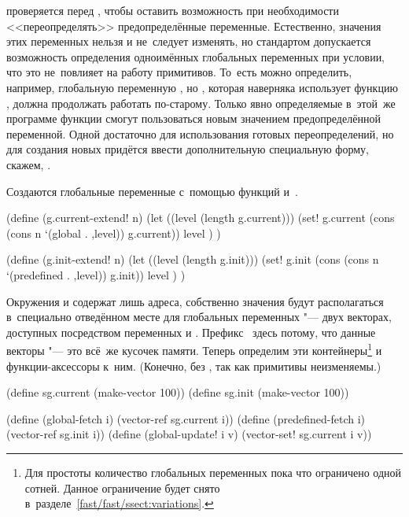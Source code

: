  проверяется перед , чтобы оставить возможность при
необходимости <<переопределять>> предопределённые переменные. Естественно,
значения этих переменных нельзя и не~следует изменять, но стандартом допускается
возможность определения одноимённых глобальных переменных при условии, что это
не~повлияет на работу примитивов. То~есть можно определить, например, глобальную
переменную , но , которая наверняка использует функцию ,
должна продолжать работать по-старому. Только явно определяемые в~этой~же
программе функции смогут пользоваться новым значением предопределённой
переменной. Одной  достаточно для использования готовых
переопределений, но для создания новых придётся ввести дополнительную
специальную форму, скажем, . 

Создаются глобальные переменные с~помощью функций 
и~.

\begin{code:lisp}
(define (g.current-extend! n)
  (let ((level (length g.current)))
    (set! g.current (cons (cons n `(global . ,level)) g.current))
    level ) )

(define (g.init-extend! n)
  (let ((level (length g.init)))
    (set! g.init (cons (cons n `(predefined . ,level)) g.init))
    level ) )
\end{code:lisp}

Окружения  и  содержат лишь адреса, собственно значения
будут располагаться в~специально отведённом месте для глобальных переменных "---
двух векторах, доступных посредством переменных  и .
Префикс~ здесь потому, что данные векторы "--- это всё~же кусочек памяти.
Теперь определим эти контейнеры\footnote{Для простоты количество глобальных
переменных пока что ограничено одной сотней. Данное ограничение будет снято
в~разделе~\ref{fast/fast/ssect:variations}.} и функции-аксессоры к~ним.
(Конечно, без , так как примитивы неизменяемы.)

\begin{code:lisp}
(define sg.current (make-vector 100))
(define sg.init (make-vector 100))

(define (global-fetch i)     (vector-ref sg.current i))
(define (predefined-fetch i) (vector-ref sg.init i))
(define (global-update! i v) (vector-set! sg.current i v))
\end{code:lisp}

